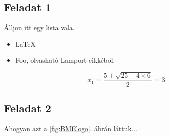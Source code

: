 \subsection{Feladat 1}
Álljon itt egy lista vala.
\begin{itemize}
 \item \LaTeX
 \item Foo, olvasható Lamport cikkéből. \cite{lamport94}
\end{itemize}
\begin{equation}
x_1 = \frac{5 + \sqrt{25 - 4 \times 6}}{2} = 3
\end{equation}
 

\subsection{Feladat 2}
Ahogyan azt a \ref{fig:BMElogo}. ábrán láttuk...

